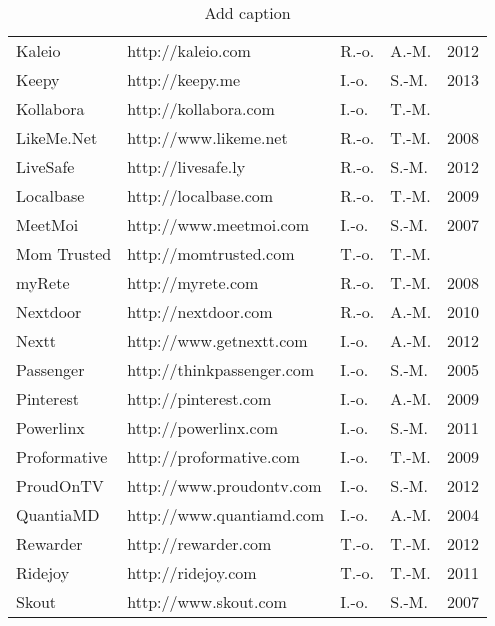 \begin{table}[htbp]
{\begin{tabular}{lllll}
    Kaleio & http://kaleio.com & R.-o. & A.-M. & 2012 \\
    Keepy & http://keepy.me & I.-o. & S.-M. & 2013 \\
    Kollabora & http://kollabora.com & I.-o. & T.-M. &  \\
    LikeMe.Net & http://www.likeme.net & R.-o. & T.-M. & 2008 \\
    LiveSafe & http://livesafe.ly & R.-o. & S.-M. & 2012 \\
    Localbase & http://localbase.com & R.-o. & T.-M. & 2009 \\
    MeetMoi & http://www.meetmoi.com & I.-o. & S.-M. & 2007 \\
    Mom Trusted & http://momtrusted.com & T.-o. & T.-M. &  \\
    myRete & http://myrete.com & R.-o. & T.-M. & 2008 \\
    Nextdoor & http://nextdoor.com & R.-o. & A.-M. & 2010 \\
    Nextt & http://www.getnextt.com & I.-o. & A.-M. & 2012 \\
    Passenger & http://thinkpassenger.com & I.-o. & S.-M. & 2005 \\
    Pinterest & http://pinterest.com & I.-o. & A.-M. & 2009 \\
    Powerlinx & http://powerlinx.com & I.-o. & S.-M. & 2011 \\
    Proformative & http://proformative.com & I.-o. & T.-M. & 2009 \\
    ProudOnTV & http://www.proudontv.com & I.-o. & S.-M. & 2012 \\
    QuantiaMD & http://www.quantiamd.com & I.-o. & A.-M. & 2004 \\
    Rewarder & http://rewarder.com & T.-o. & T.-M. & 2012 \\
    Ridejoy & http://ridejoy.com & T.-o. & T.-M. & 2011 \\
    Skout & http://www.skout.com & I.-o. & S.-M. & 2007 \\
    \bottomrule
    \end{tabular}%
    \caption{Add caption}
   }
  \label{tab:addlabel}%
\end{table}%

